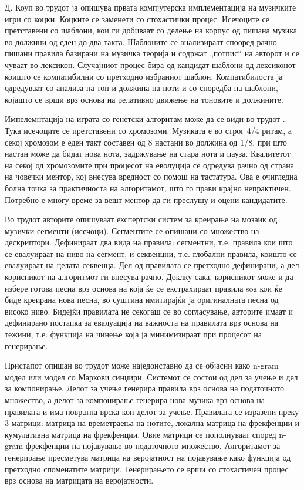 Д. Коуп во трудот \cite{Cope1991} ја опишува првата компјутерска имплементација на музичките игри со коцки. Коцките се заменети со стохастички процес. Исечоците се претставени со шаблони, кои ги добиваат со делење на корпус од пишана музика во должини од еден до два такта. Шаблоните се анализираат спооред рачно пишани правила базирани на музичка теорија и содржат „потпис“ на авторот и се чуваат во лексикон. Случајниот процес бира од кандидат шаблони од лексиконот коишто се компатибилни со претходно избраниот шаблон. Компатибилоста ја одредуваат со анализа на тон и должина на ноти и со споредба на шаблони, којашто се врши врз основа на релативно движење на тоновите и должините.

Импелемнтација на играта со генетски алгоритам може да се види во трудот \cite{Biles1994}. Тука исечоците се претставени со хромозоми. Музиката е во строг 4/4 ритам, а секој хромозом е еден такт составен од 8 настани во должина од 1/8, при што настан може да бидат нова нота, задржување на стара нота и пауза. Квалитетот на секој од хромозомите при процесот на еволуција се одредува рачно од страна на човечки ментор, кој внесува вредност со помош на тастатура. Ова е очигледна болна точка за практичноста на алгоритамот, што го прави крајно непрактичен. Потребно е многу време за вешт ментор да ги преслушу и оцени кандидатите. 

Во трудот \cite{Zils2001} авторите опишуваат експертски систем за креирање на мозаик од музички сегменти (исечоци). Сегментите се опишани со множество на дескриптори. Дефинираат два вида на правила: сегментни, т.е. правила кои што се евалуираат на ниво на сегмент, и секвенцни, т.е. глобални правила, коишто се евалуираат на целата секвенца. Дел од правилата се претходно дефинирани, а дел корисникот на алгоритмот ги внесува рачно. Доклку сака, корисникот може и да избере готова песна врз основа на која ќе се екстрахираат правила soа кои ќе биде креирана нова песна, во суштина имитирајќи ја оригиналната песна од високо ниво. Бидејќи правилата не секогаш се во согласување, авторите имаат и дефинирано постапка за евалуација на важноста на правилата врз основа на тежини, т.е. функција на чинење која ја минимизираат при процесот на генерирање.

Пристапот опишан во трудот \cite{GarciaSalas2011} може наједонставно да се објасни како n-gram модел или модел со Маркови синџири. Системот се состои од дел за учење и дел за компонирање. Делот за учење генерира правила врз основа на податочното множество, а делот за компонирање генерира нова музика врз основа на правилата и има повратна врска кон делот за учење. Правилата се изразени преку 3 матрици: матрица на времетраења на нотите, локална матрица на фрекфенции и кумулативна матрица на фрекфенции. Овие матрици се пополнуваат според n-gram фрекфенции на појавување во податочното множество. Алгоритамот за генерирање пресметува матрица на веројатност на појавување како функција од претходно споменатите матрици. Генерирањето се врши со стохастичен процес врз основа на матрицата на веројатности. 

